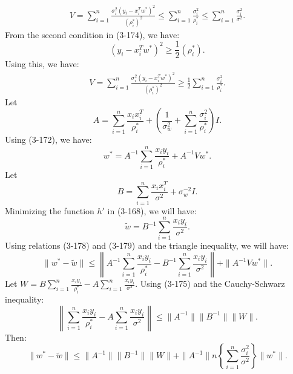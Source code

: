 \documentclass[12pt]{article}
\begin{document}
	\begin{align}
		V = \sum_{i=1}^{n} \frac{\sigma_i^2 (y_i - x_i^T w^*)^2}{(\rho_i^*)^2} \le \sum_{i=1}^{n} \frac{\sigma_i^2}{\rho_i^*} \le \sum_{i=1}^{n} \frac{\sigma_i^2}{\sigma^2}.
	\end{align}
	From the second condition in (3-174), we have:
	\begin{equation}
		(y_i - x_i^T w^*)^2 \ge \frac{1}{2}(\rho_i^*).
	\end{equation}
	Using this, we have:
	\begin{align}
		V = \sum_{i=1}^{n} \frac{\sigma_i^2 (y_i - x_i^T w^*)^2}{(\rho_i^*)^2} \ge \frac{1}{2} \sum_{i=1}^{n} \frac{\sigma_i^2}{\rho_i^*}.
	\end{align}
	Let
	\begin{equation}
		A = \sum_{i=1}^{n} \frac{x_i x_i^T}{\rho_i^*} + \left( \frac{1}{\sigma_w^2} + \sum_{i=1}^{n} \frac{\sigma_i^2}{\rho_i^*} \right) I.
	\end{equation}
	Using (3-172), we have:
	\begin{equation}
		w^* = A^{-1} \sum_{i=1}^{n} \frac{x_i y_i}{\rho_i^*} + A^{-1} V w^*.
	\end{equation}
	Let
	\begin{equation}
		B = \sum_{i=1}^{n} \frac{x_i x_i^T}{\sigma^2} + \sigma_w^{-2} I.
	\end{equation}
	Minimizing the function $h'$ in (3-168), we will have:
	\begin{equation}
		\tilde{w} = B^{-1} \sum_{i=1}^{n} \frac{x_i y_i}{\sigma^2}.
	\end{equation}
	Using relations (3-178) and (3-179) and the triangle inequality, we will have:
	\begin{equation}
		\|w^* - \tilde{w}\| \le \left\| A^{-1} \sum_{i=1}^{n} \frac{x_i y_i}{\rho_i^*} - B^{-1} \sum_{i=1}^{n} \frac{x_i y_i}{\sigma^2} \right\| + \| A^{-1} V w^* \|.
	\end{equation}
	Let $W = B \sum_{i=1}^{n} \frac{x_i y_i}{\rho_i^*} - A \sum_{i=1}^{n} \frac{x_i y_i}{\sigma^2}$. Using (3-175) and the Cauchy-Schwarz inequality:
	\begin{equation}
		\left\| \sum_{i=1}^{n} \frac{x_i y_i}{\rho_i^*} - A \sum_{i=1}^{n} \frac{x_i y_i}{\sigma^2} \right\| \le \| A^{-1} \| \| B^{-1} \| \| W \|.
	\end{equation}
	Then:
	\begin{equation}
		\|w^* - \tilde{w}\| \le \|A^{-1}\| \|B^{-1}\| \|W\| + \|A^{-1}\| n \left\{ \sum_{i=1}^{n} \frac{\sigma_i^2}{\sigma^2} \right\} \|w^*\|.
	\end{equation}
\end{document}
